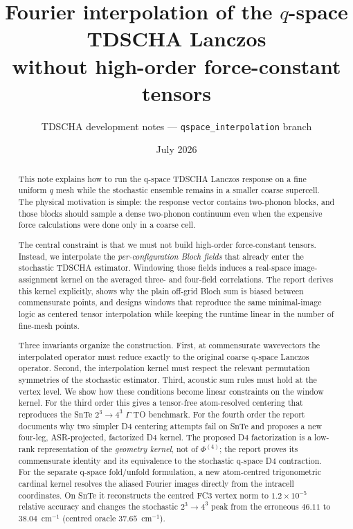 \documentclass[11pt,a4paper]{article}
\title{Fourier interpolation of the $q$-space TDSCHA Lanczos\\
without high-order force-constant tensors}
\author{TDSCHA development notes --- \texttt{qspace\_interpolation} branch}
\date{July 2026}
\begin{document}
\maketitle

\begin{abstract}
This note explains how to run the q-space TDSCHA Lanczos response on a
fine uniform $q$ mesh while the stochastic ensemble remains in a smaller
coarse supercell.  The physical motivation is simple: the response vector
contains two-phonon blocks, and those blocks should sample a dense
two-phonon continuum even when the expensive force calculations were done
only in a coarse cell.

The central constraint is that we must not build high-order force-constant
tensors.  Instead, we interpolate the \emph{per-configuration Bloch fields}
that already enter the stochastic TDSCHA estimator.  Windowing those fields
induces a real-space image-assignment kernel on the averaged three- and
four-field correlations.  The report derives this kernel explicitly,
shows why the plain off-grid Bloch sum is biased between commensurate
points, and designs windows that reproduce the same minimal-image logic as
centered tensor interpolation while keeping the runtime linear in the
number of fine-mesh points.

Three invariants organize the construction.  First, at commensurate
wavevectors the interpolated operator must reduce exactly to the original
coarse q-space Lanczos operator.  Second, the interpolation kernel must
respect the relevant permutation symmetries of the stochastic estimator.
Third, acoustic sum rules must hold at the vertex level.  We show how these
conditions become linear constraints on the window kernel.  For the third
order this gives a tensor-free atom-resolved centering that reproduces the
SnTe $2^3\to4^3$ $\Gamma$ TO benchmark.  For the fourth order the report
documents why two simpler D4 centering attempts fail on SnTe and proposes a
new four-leg, ASR-projected, factorized D4 kernel.  The proposed D4
factorization is a low-rank representation of the \emph{geometry kernel},
not of $\Phi^{(4)}$; the report proves its commensurate identity and its
equivalence to the stochastic q-space D4 contraction.
For the separate q-space fold/unfold formulation, a new atom-centred
trigonometric cardinal kernel resolves the aliased Fourier images directly
from the intracell coordinates.  On SnTe it reconstructs the centred FC3
vertex norm to $1.2\times10^{-5}$ relative accuracy and changes the
stochastic $2^3\to4^3$ peak from the erroneous $46.11$ to
$38.04$~cm$^{-1}$ (centred oracle $37.65$~cm$^{-1}$).
\end{abstract}
\end{document}
